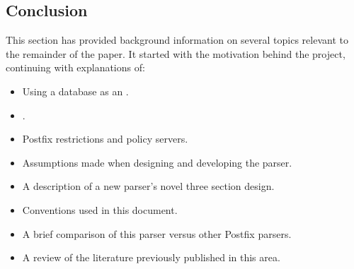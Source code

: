 \documentclass[a4paper,12pt,draft]{article}
\begin{document}
%

\subsection{Conclusion}

This section has provided background information on several topics relevant
to the remainder of the paper.  It started with the motivation behind the
project, continuing with explanations of:

\begin{itemize}

    \item Using a database as an \API{}.

    \item \SMTP{}.

    \item Postfix restrictions and policy servers.

    \item Assumptions made when designing and developing the parser.

    \item A description of a new parser's novel three section design.

    \item Conventions used in this document.

    \item A brief comparison of this parser versus other Postfix parsers.

    \item A review of the literature previously published in this area.

\end{itemize}
\end{document}
